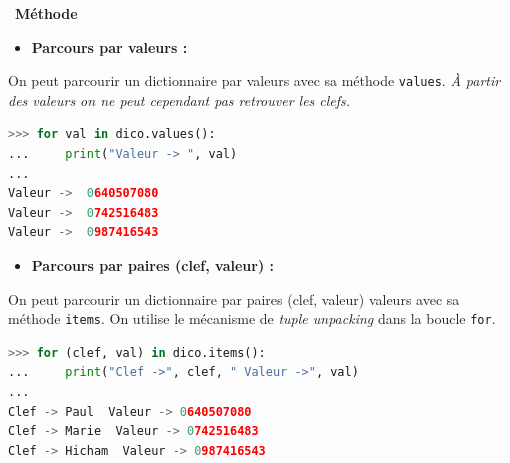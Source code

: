 \documentclass[
  11pt,
]{article}
\newcommand{\passthrough}[1]{#1}
\providecommand{\tightlist}{%
  \setlength{\itemsep}{0pt}\setlength{\parskip}{0pt}}
\newcounter{cours}
\newenvironment{methode}[1]
{\par \medskip    \noindent  
 \begin {bclogo}[arrondi =0.1,logo=\bcoutil, marge=4,noborder = true] {~\textbf{Méthode}   {\itshape #1} }  \par}
{
\end{bclogo}
 \par \bigskip }
\begin{document}
\begin{methode}{}
\begin{itemize}
\tightlist
\item
  \textbf{Parcours par valeurs :}
\end{itemize}

On peut parcourir un dictionnaire par valeurs avec sa méthode
\passthrough{\lstinline!values!}. \emph{À partir des valeurs on ne peut
cependant pas retrouver les clefs.}

\begin{lstlisting}[language=Python]
>>> for val in dico.values():
...     print("Valeur -> ", val)
... 
Valeur ->  0640507080
Valeur ->  0742516483
Valeur ->  0987416543
\end{lstlisting}

\begin{itemize}
\tightlist
\item
  \textbf{Parcours par paires (clef, valeur) :}
\end{itemize}

On peut parcourir un dictionnaire par paires (clef, valeur) valeurs avec
sa méthode \passthrough{\lstinline!items!}. On utilise le mécanisme de
\emph{tuple unpacking} dans la boucle \passthrough{\lstinline!for!}.

\begin{lstlisting}[language=Python]
>>> for (clef, val) in dico.items():
...     print("Clef ->", clef, " Valeur ->", val)
... 
Clef -> Paul  Valeur -> 0640507080
Clef -> Marie  Valeur -> 0742516483
Clef -> Hicham  Valeur -> 0987416543
\end{lstlisting}

\end{methode}
\end{document}
